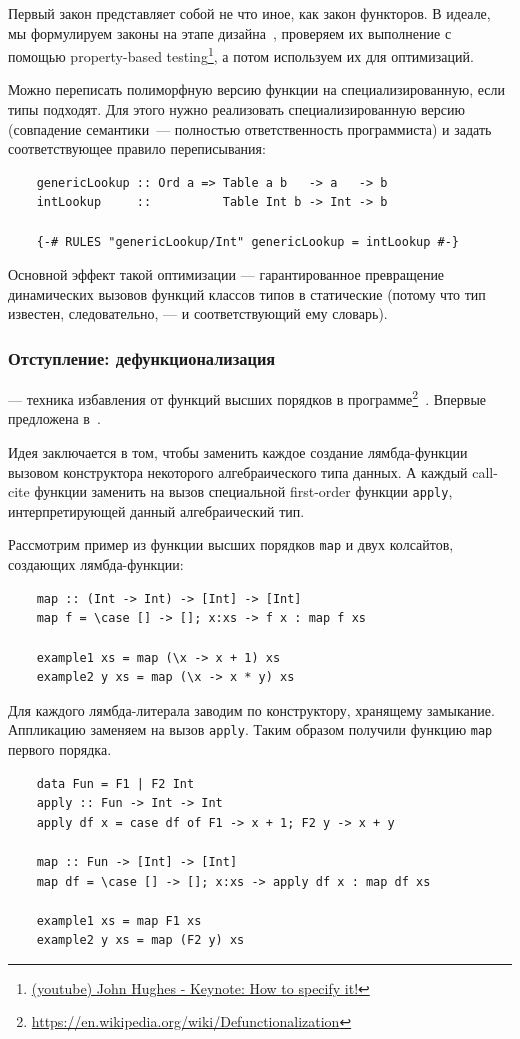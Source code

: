 Первый закон представляет собой не что иное, как закон функторов.
В идеале, мы формулируем законы на этапе дизайна~\cite{maguire-algebra}, проверяем их выполнение с помощью property-based testing\footnote{\href{https://youtu.be/G0NUOst-53U?si=vdcKVUi9vSPBY0Jz}{(youtube) John Hughes - Keynote: How to specify it!}}, а потом используем их для оптимизаций.

Можно переписать полиморфную версию функции на специализированную, если типы подходят.
Для этого нужно реализовать специализированную версию (совпадение семантики~--- полностью ответственность программиста) и задать соответствующее правило переписывания:
\begin{verbatim}
    genericLookup :: Ord a => Table a b   -> a   -> b
    intLookup     ::          Table Int b -> Int -> b

    {-# RULES "genericLookup/Int" genericLookup = intLookup #-}
\end{verbatim}

Основной эффект такой оптимизации --- гарантированное превращение динамических вызовов функций классов типов в статические (потому что тип известен, следовательно, --- и соответствующий ему словарь).

\subsubsection{Отступление: дефункционализация} \label{subsubsec:defunctionalization}

 --- техника избавления от функций высших порядков в программе\footnote{\url{https://en.wikipedia.org/wiki/Defunctionalization}}~\cite{defunctionalization-slides}.
Впервые предложена в~\cite{reynolds1972definitional, reynolds1998definitional}.

Идея заключается в том, чтобы заменить каждое создание лямбда-функции вызовом конструктора некоторого алгебраического типа данных.
А каждый call-cite функции заменить на вызов специальной first-order функции \texttt{apply}, интерпретирующей данный алгебраический тип.

Рассмотрим пример из функции высших порядков \texttt{map} и двух колсайтов, создающих лямбда-функции:
\begin{verbatim}
    map :: (Int -> Int) -> [Int] -> [Int]
    map f = \case [] -> []; x:xs -> f x : map f xs

    example1 xs = map (\x -> x + 1) xs
    example2 y xs = map (\x -> x * y) xs
\end{verbatim}
Для каждого лямбда-литерала заводим по конструктору, хранящему замыкание.
Аппликацию заменяем на вызов \texttt{apply}.
Таким образом получили функцию \texttt{map} первого порядка.
\begin{verbatim}
    data Fun = F1 | F2 Int
    apply :: Fun -> Int -> Int
    apply df x = case df of F1 -> x + 1; F2 y -> x + y

    map :: Fun -> [Int] -> [Int]
    map df = \case [] -> []; x:xs -> apply df x : map df xs

    example1 xs = map F1 xs
    example2 y xs = map (F2 y) xs
\end{verbatim}

